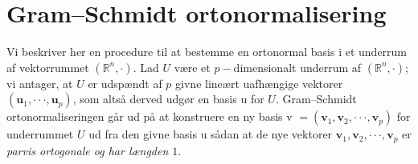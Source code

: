 

\section{Gram--Schmidt ortonormalisering}
Vi beskriver her en procedure til at bestemme en ortonormal basis i et underrum af vektorrummet $(\mathbb{R}^{n}, \bm{\cdot})$. Lad $U$ være et $p-$dimensionalt underrum af $(\mathbb{R}^{n}, \bm{\cdot})$; vi antager, at $U$ er udspændt af $p$ givne lineært uafhængige vektorer $( \mathbf{u}_{1}, \cdot  \cdot \cdot, \mathbf{u}_{p} )$, som altså derved udgør en basis  u for $U$. Gram--Schmidt ortonormaliseringen går ud på at konstruere en ny basis v $= ( \mathbf{v}_{1}, \mathbf{v}_{2}, \cdot \cdot \cdot ,  \mathbf{v}_{p} )$ for underrummet $U$ ud fra den givne basis u sådan at de nye vektorer $\mathbf{v}_{1}, \mathbf{v}_{2}, \cdot \cdot \cdot ,  \mathbf{v}_{p}$ er {\em{parvis ortogonale og har længden $1$}}.

